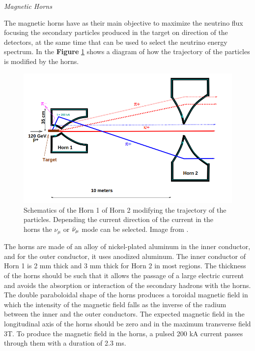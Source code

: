 \textit{Magnetic Horns}

The magnetic horns have as their main objective to maximize the neutrino flux focusing the secondary particles produced in the target on direction of the detectors, at the same time that can be used to select the neutrino energy spectrum. In the \textbf{Figure} \ref{fig:MnvExp:NuMI:HornsFocusSystem} shows a diagram of how the trajectory of the particles is modified by the horns. 

\begin{figure}[!htb]
\centering
\includegraphics[scale=0.33]{Figures/Chapter2/HornsFocusSystem.png}
        \caption{Schematics of the Horn 1 of Horn 2 modifying the trajectory of the particles. Depending the current direction of the current in the horns the $\nu_\mu$ or $\Bar{\nu}_\mu$ mode can be selected. Image from \cite{Numi}.} 
\label{fig:MnvExp:NuMI:HornsFocusSystem}
\end{figure}

The horns are made of an alloy of nickel-plated aluminum in the inner conductor, and for the outer conductor, it uses anodized aluminum. The inner conductor of Horn 1 is 2 mm thick and 3 mm thick for Horn 2 in most regions. The thickness of the horns should be such that it allows the passage of a large electric current and avoids the absorption or interaction of the secondary hadrons with the horns. The double paraboloidal shape of the horns produces a toroidal magnetic field in which the intensity of the magnetic field falls as the inverse of the radium between the inner and the outer conductors. The expected magnetic field in the longitudinal axis of the horns should be zero and in the maximum transverse field 3T. To produce the magnetic field in the horns, a pulsed 200 kA current passes through them with a duration of 2.3 ms.

